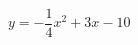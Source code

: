 \hspace*{2mm}\begin{minipage}[t]{\dimexpr\linewidth-2mm\relax}\vspace{0pt}
$y=-\dfrac{1}{4}x^2+3x-10$\end{minipage}

